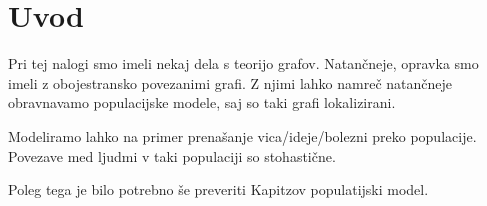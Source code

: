 \documentclass[12pt, a4paper]{article}
\begin{document}
\section{Uvod}

Pri tej nalogi smo imeli nekaj dela s teorijo grafov. Natan\v{c}neje, opravka smo imeli z obojestransko povezanimi
grafi. Z njimi lahko namre\v{c} natan\v{c}neje obravnavamo populacijske modele, saj so taki grafi lokalizirani.

Modeliramo lahko na primer prena\v{s}anje vica/ideje/bolezni preko populacije. Povezave med ljudmi v taki populaciji so
stohasti\v{c}ne.

Poleg tega je bilo potrebno \v{s}e preveriti Kapitzov populatijski model.
\end{document}
